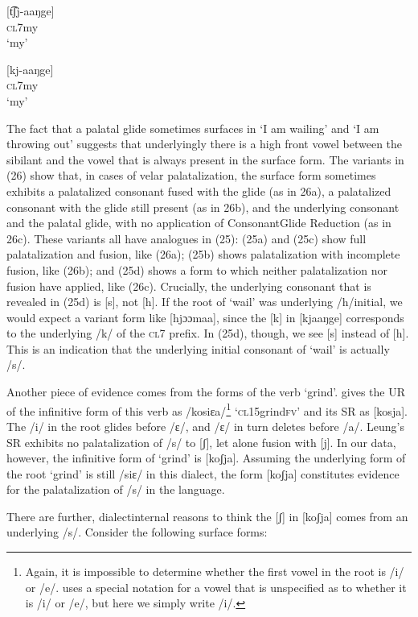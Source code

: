 \documentclass[output=paper]{langsci/langscibook}
\begin{document}
\ea{}
 [t͡ʃj-aaŋge]\\{}
\textsc{cl7}my\\{}
\glt ‘my’
\z


\ea{}
 [kj-aaŋge]\\{}
\textsc{cl7}my\\{}
\glt ‘my’
\z

The fact that a palatal glide sometimes surfaces in ‘I am wailing’ and ‘I am throwing out’ suggests that underlyingly there is a high front vowel between the sibilant and the vowel that is always present in the surface form. The variants in (26) show that, in cases of velar palatalization, the surface form sometimes exhibits a palatalized consonant fused with the glide (as in 26a), a palatalized consonant with the glide still present (as in 26b), and the underlying consonant and the palatal glide, with no application of ConsonantGlide Reduction (as in 26c). These variants all have analogues in (25): (25a) and (25c) show full palatalization and fusion, like (26a); (25b) shows palatalization with incomplete fusion, like (26b); and (25d) shows a form to which neither palatalization nor fusion have applied, like (26c). Crucially, the underlying consonant that is revealed in (25d) is [s], not [h]. If the root of ‘wail’ was underlying /h/initial, we would expect a variant form like [hjɔɔmaa], since the [k] in [kjaaŋge] corresponds to the underlying /k/ of the \textsc{cl}7 prefix. In (25d), though, we see [s] instead of [h]. This is an indication that the underlying initial consonant of ‘wail’ is actually /s/. 

Another piece of evidence comes from the forms of the verb ‘grind’. \citet{Leung1991} gives the UR of the infinitive form of this verb as /kosiɛa/\footnote{   Again, it is impossible to determine whether the first vowel in the root is /i/ or /e/. \citet{Leung1991} uses a special notation for a vowel that is unspecified as to whether it is /i/ or /e/, but here we simply write /i/.}  ‘\textsc{cl}15grind\textsc{fv}’ and its SR as [kosja]. The /i/ in the root glides before /ɛ/, and /ɛ/ in turn deletes before /a/. Leung’s SR exhibits no palatalization of /s/ to [ʃ], let alone fusion with [j]. In our data, however, the infinitive form of ‘grind’ is [koʃja]. Assuming the underlying form of the root ‘grind’ is still /siɛ/ in this dialect, the form [koʃja] constitutes evidence for the palatalization of /s/ in the language. 

There are further, dialectinternal reasons to think the [ʃ] in [koʃja] comes from an underlying /s/. Consider the following surface forms:
\end{document}
